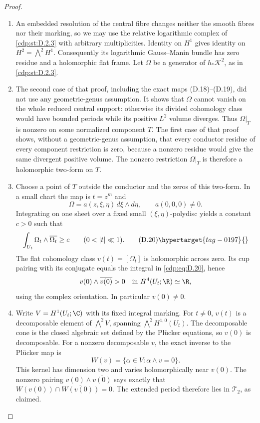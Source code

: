 \begin{proof}

\begin{enumerate}[label={$\langle1\rangle$\arabic*.},leftmargin=*]
\item An embedded resolution of the central fibre changes neither
the smooth fibres nor their marking, so we may use the relative
logarithmic complex of \ref{cdp:st:D.2.3} with arbitrary multiplicities.
Identity on $H^1$ gives identity on $H^2=\bigwedge^2H^1$.
Consequently its logarithmic Gauss--Manin bundle has zero
residue and a holomorphic flat frame. Let $\Omega$ be a
generator of $h_*\mathscr K^2$, as in \ref{cdp:st:D.2.3}.

\item The second case of that proof, including the exact maps
(D.18)--(D.19), did not use any geometric-genus assumption.
It shows that $\Omega$ cannot vanish on the whole reduced
central support: otherwise its divided cohomology class would
have bounded periods while its positive $L^2$ volume diverges.
Thus $\Omega|_T$ is nonzero on some normalized component $T$.
The first case of that proof shows, without a geometric-genus
assumption, that every conductor residue of every component
restriction is zero, because a nonzero residue would give the
same divergent positive volume. The nonzero restriction
$\Omega|_T$ is therefore a holomorphic two-form on $T$.

\item Choose a point of $T$ outside the conductor and the zeros of
this two-form. In a small chart the map is $t=z^m$ and
\[
 \Omega=a(z,\xi,\eta)\,d\xi\wedge d\eta,
 \qquad a(0,0,0)\ne0.
\]
Integrating on one sheet over a fixed small
$(\xi,\eta)$-polydisc yields a constant $c>0$ such that
\[
 \int_{U_t}\Omega_t\wedge\overline{\Omega_t}\ge c
 \qquad(0<|t|\ll1).
\tag{D.20}\hypertarget{tag-0197}{}\label{cdp:eq:D.20}
\]
The flat cohomology class $v(t)=[\Omega_t]$ is holomorphic
across zero. Its cup pairing with its conjugate equals the
integral in \eqref{cdp:eq:D.20}, hence
\[
 v(0)\wedge\overline{v(0)}>0
 \quad\hbox{in }H^4(U_t;\R)\simeq\R,
\]
using the complex orientation. In particular $v(0)\ne0$.

\item Write $V=H^1(U_t;\C)$ with its fixed integral marking.
For $t\ne0$, $v(t)$ is a decomposable element of
$\bigwedge^2V$, spanning $\bigwedge^2H^{1,0}(U_t)$.
The decomposable cone is the closed algebraic set defined by
the Pl\"ucker equations, so $v(0)$ is decomposable. For a
nonzero decomposable $v$, the exact inverse to the Pl\"ucker
map is
\[
 W(v)=\{\alpha\in V:\alpha\wedge v=0\}.
\]
This kernel has dimension two and varies holomorphically near
$v(0)$. The nonzero pairing
$v(0)\wedge\overline{v(0)}$ says exactly that
$W(v(0))\cap\overline{W(v(0))}=0$. The extended period
therefore lies in $\mathcal T_2$, as claimed.


\end{enumerate}
\end{proof}
